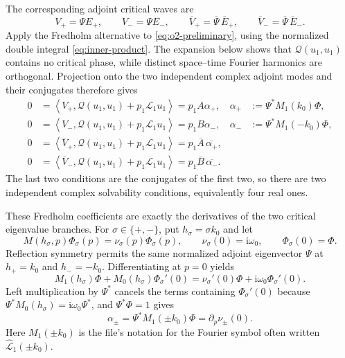 \documentclass[11pt]{article}
\newcommand{\ii}{\mathrm{i}}
\newcommand{\cQ}{\mathcal{Q}}
\newcommand{\cL}{\mathcal{L}}
\newcommand{\ip}[2]{\left\langle #1,#2\right\rangle}
\begin{document}
The corresponding adjoint critical waves are
\begin{equation}
  V_+=\Psi E_+,\qquad V_-=\Psi E_-,\qquad
  \overline V_+=\overline\Psi\,\overline E_+,\qquad
  \overline V_-=\overline\Psi\,\overline E_-.
\end{equation}
Apply the Fredholm alternative to \eqref{eq:o2-preliminary}, using the
normalized double integral \eqref{eq:inner-product}.  The expansion below
shows that $\cQ(u_1,u_1)$ contains no critical phase, while distinct
space--time Fourier harmonics are orthogonal.  Projection onto the two
independent complex adjoint modes and their conjugates therefore gives
\begin{subequations}
\label{eq:o2-four-projections}
\begin{align}
  0&=\ip{V_+}{\cQ(u_1,u_1)+p_1\cL_1u_1}
    =p_1A\alpha_+,
  &\alpha_+&:=\Psi^*M_1(k_0)\Phi,\\
  0&=\ip{V_-}{\cQ(u_1,u_1)+p_1\cL_1u_1}
    =p_1B\alpha_-,
  &\alpha_-&:=\Psi^*M_1(-k_0)\Phi,\\
  0&=\ip{\overline V_+}{\cQ(u_1,u_1)+p_1\cL_1u_1}
    =p_1\overline A\,\overline{\alpha_+},&&\\
  0&=\ip{\overline V_-}{\cQ(u_1,u_1)+p_1\cL_1u_1}
    =p_1\overline B\,\overline{\alpha_-}.&&
\end{align}
\end{subequations}
The last two conditions are the conjugates of the first two, so there are two
independent complex solvability conditions, equivalently four real ones.

These Fredholm coefficients are exactly the derivatives of the two critical
eigenvalue branches.  For $\sigma\in\{+,-\}$, put $h_\sigma=\sigma k_0$ and
let
\begin{equation}
  M(h_\sigma,p)\Phi_\sigma(p)
  =\nu_\sigma(p)\Phi_\sigma(p),
  \qquad
  \nu_\sigma(0)=\ii\omega_0,\qquad
  \Phi_\sigma(0)=\Phi.
\end{equation}
Reflection symmetry permits the same normalized adjoint eigenvector $\Psi$
at $h_+=k_0$ and $h_-=-k_0$.  Differentiating at $p=0$ yields
\begin{equation}
  M_1(h_\sigma)\Phi+M_0(h_\sigma)\Phi_\sigma'(0)
  =\nu_\sigma'(0)\Phi+\ii\omega_0\Phi_\sigma'(0).
\end{equation}
Left multiplication by $\Psi^*$ cancels the terms containing
$\Phi_\sigma'(0)$ because
$\Psi^*M_0(h_\sigma)=\ii\omega_0\Psi^*$, and $\Psi^*\Phi=1$ gives
\begin{equation}
  \boxed{
  \alpha_\pm=\Psi^*M_1(\pm k_0)\Phi
  =\partial_p\nu_\pm(0).}
  \label{eq:alpha-eigenvalue-derivatives}
\end{equation}
Here $M_1(\pm k_0)$ is the file's notation for the Fourier symbol often
written $\widehat{\cL}_1(\pm k_0)$.
\end{document}

